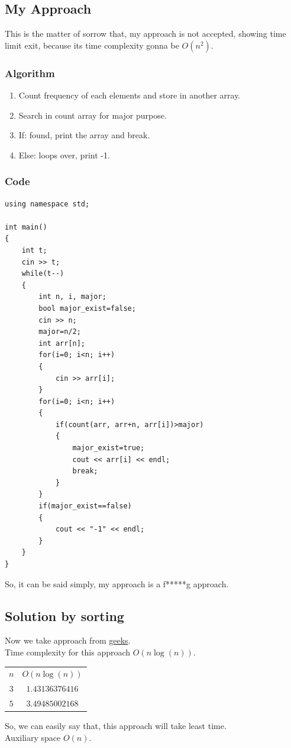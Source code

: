 \documentclass[11 pt]{article}
\begin{document}
\subsection{My Approach}
This is the matter of sorrow that, my approach is not accepted, showing time limit exit, because its time complexity gonna be $O(n^2)$.
\subsubsection{Algorithm}
\begin{tcolorbox}
\begin{enumerate}
 \item Count frequency of each elements and store in another array.
 \item Search in count array for major purpose.
 \item If: found, print the array and break.
 \item Else: loops over, print -1.
\end{enumerate}
\end{tcolorbox}
\subsubsection{Code}
\begin{lstlisting}[caption=Majority Element 1'st code, frame=shadowbox, rulesepcolor=\color{green!70}]
using namespace std;

int main()
{
    int t;
    cin >> t;
    while(t--)
    {
        int n, i, major;
        bool major_exist=false;
        cin >> n;
        major=n/2;
        int arr[n];
        for(i=0; i<n; i++)
        {
            cin >> arr[i];
        }
        for(i=0; i<n; i++)
        {
            if(count(arr, arr+n, arr[i])>major)
            {
                major_exist=true;
                cout << arr[i] << endl;
                break;
            }
        }
        if(major_exist==false)
        {
            cout << "-1" << endl;
        }
    }
}

\end{lstlisting}
So, it can be said simply, my approach is a f*****g approach.

\subsection{Solution by sorting}
Now we take approach from \href{https://www.geeksforgeeks.org/majority-element/}{geeks}.\\
Time complexity for this approach $O(n\log(n))$.\\
\begin{center}
\begin{tabular}{c c}
$n$ & $O(n\log(n))$\\
$3$ & $1.43136376416$\\
$5$ & $3.49485002168$
\end{tabular}
\end{center}
So, we can easily say that, this approach will take least time.
\\Auxiliary space $O(n)$.
\end{document}
